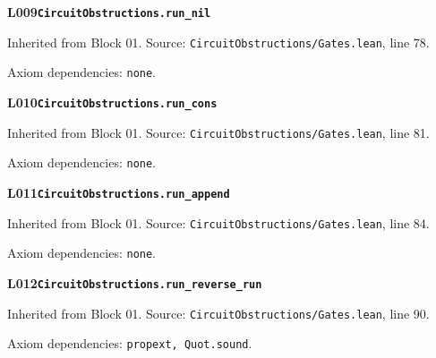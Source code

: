 \begin{minipage}{\linewidth}
\hypertarget{L009}{}
{\small\sffamily\bfseries\color{ink}L009\quad\nolinkurl{CircuitObstructions.run_nil}}\par
{\scriptsize\sffamily\color{muted}Inherited from Block 01. Source: \nolinkurl{CircuitObstructions/Gates.lean}, line 78.}\par
{}
{\scriptsize\sffamily\color{muted}Axiom dependencies: \nolinkurl{none}.}
\end{minipage}\par\medskip
\begin{minipage}{\linewidth}
\hypertarget{L010}{}
{\small\sffamily\bfseries\color{ink}L010\quad\nolinkurl{CircuitObstructions.run_cons}}\par
{\scriptsize\sffamily\color{muted}Inherited from Block 01. Source: \nolinkurl{CircuitObstructions/Gates.lean}, line 81.}\par
{}
{\scriptsize\sffamily\color{muted}Axiom dependencies: \nolinkurl{none}.}
\end{minipage}\par\medskip
\begin{minipage}{\linewidth}
\hypertarget{L011}{}
{\small\sffamily\bfseries\color{ink}L011\quad\nolinkurl{CircuitObstructions.run_append}}\par
{\scriptsize\sffamily\color{muted}Inherited from Block 01. Source: \nolinkurl{CircuitObstructions/Gates.lean}, line 84.}\par
{}
{\scriptsize\sffamily\color{muted}Axiom dependencies: \nolinkurl{none}.}
\end{minipage}\par\medskip
{}\par\medskip
\begin{minipage}{\linewidth}
\hypertarget{L012}{}
{\small\sffamily\bfseries\color{ink}L012\quad\nolinkurl{CircuitObstructions.run_reverse_run}}\par
{\scriptsize\sffamily\color{muted}Inherited from Block 01. Source: \nolinkurl{CircuitObstructions/Gates.lean}, line 90.}\par
{}
{\scriptsize\sffamily\color{muted}Axiom dependencies: \nolinkurl{propext, Quot.sound}.}
\end{minipage}\par\medskip
